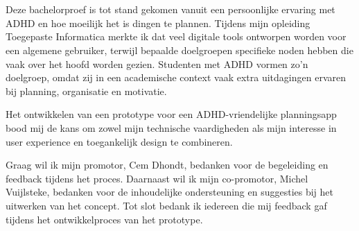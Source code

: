 
\chapter*{}%
\label{ch:voorwoord}

Deze bachelorproef is tot stand gekomen vanuit een persoonlijke ervaring met ADHD en hoe moeilijk het is dingen te plannen. 
Tijdens mijn opleiding Toegepaste Informatica merkte ik dat veel digitale tools ontworpen worden voor een algemene gebruiker,
terwijl bepaalde doelgroepen specifieke noden hebben die vaak over het hoofd worden gezien. Studenten
met ADHD vormen zo'n doelgroep, omdat zij in een academische context vaak extra uitdagingen ervaren bij
planning, organisatie en motivatie.

Het ontwikkelen van een prototype voor een ADHD-vriendelijke planningsapp bood mij de kans om zowel mijn
technische vaardigheden als mijn interesse in user experience en toegankelijk design te combineren.

Graag wil ik mijn promotor, Cem Dhondt, bedanken voor de begeleiding en feedback tijdens het proces.
Daarnaast wil ik mijn co-promotor, Michel Vuijlsteke, bedanken voor de inhoudelijke ondersteuning en
suggesties bij het uitwerken van het concept. Tot slot bedank ik iedereen die mij feedback gaf tijdens het
ontwikkelproces van het prototype.
